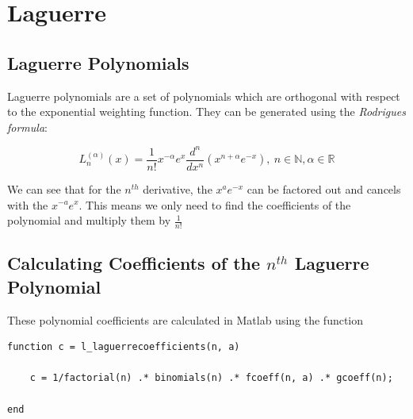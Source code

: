\documentclass{article}
\begin{document}






















\section{Laguerre} 
\subsection{Laguerre Polynomials}

Laguerre polynomials are a set of polynomials which are orthogonal with respect to the exponential weighting function. They can be generated using the \emph{Rodrigues formula}:

$$
L_n^{(\alpha)}(x) = \frac{1}{n!} x^{-\alpha} e^x \frac{d^n}{dx^n}(x^{n+\alpha} e^{-x}),\    n \in  \mathbb{N}, \alpha \in \mathbb{R} 
$$


We can see that for the $n^{th}$ derivative, the $x^{a}e^{-x}$ can be factored out and cancels with the $x^{-a}e^{x}$. This means we only need to find the coefficients of the polynomial and multiply them by $\frac{1}{n!}$

















\subsection{Calculating Coefficients of the $n^{th}$ Laguerre Polynomial}

These polynomial coefficients are calculated in Matlab using the function 

\begin{lstlisting}
function c = l_laguerrecoefficients(n, a)
    
    c = 1/factorial(n) .* binomials(n) .* fcoeff(n, a) .* gcoeff(n);
    
end
\end{lstlisting}
\end{document}
